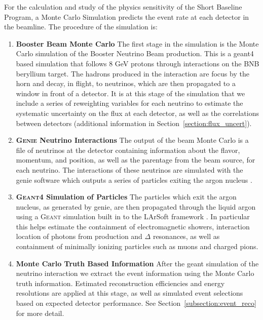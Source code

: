 For the calculation and study of the physics sensitivity of the Short Baseline Program, a Monte Carlo Simulation predicts the event rate at each detector in the beamline.  The procedure of the simulation is:

\begin{enumerate}

  \item {\bf Booster Beam Monte Carlo} The first stage in the simulation is the Monte Carlo simulation of the Booster Neutrino Beam production. This is a geant4 based simulation that follows 8 GeV protons through interactions on the BNB beryllium target. The hadrons produced in the interaction are focus by the horn and decay, in flight, to neutrinos, which are then propagated to a window in front of a detector. It is at this stage of the simulation that we include a series of reweighting variables for each neutrino to estimate the systematic uncertainty on the flux at each detector, as well as the correlations between detectors (additional information in Section~\ref{section:flux_uncert}).

  \item {\bf \textsc{Genie} Neutrino Interactions} The output of the beam Monte Carlo is a file of neutrinos at the detector containing information about the flavor, momentum, and position, as well as the parentage from the beam source, for each neutrino. The interactions of these neutrinos are simulated with the genie software which outputs a series of particles exiting the argon nucleus \cite{Andreopoulos:2009rq}. 

  \item {\bf \textsc{Geant4} Simulation of Particles} The particles which exit the argon nucleus, as generated by genie, are then propagated through the liquid argon using a \textsc{Geant} \cite{Agostinelli:2002hh} simulation built in to the LArSoft framework \cite{Church:2013hea}. In particular this helps estimate the containment of electromagnetic showers, interaction location of photons from \pizero production and $\Delta$ resonances, as well as containment of minimally ionizing particles such as muons and charged pions.

  \item {\bf Monte Carlo Truth Based Information}  After the geant simulation of the neutrino interaction we extract the event information using the Monte Carlo truth information. Estimated reconstruction efficiencies and energy resolutions are applied at this stage, as well as simulated event selections based on expected detector performance.  See Section~\ref{subsection:event_reco} for more detail.

\end{enumerate}


